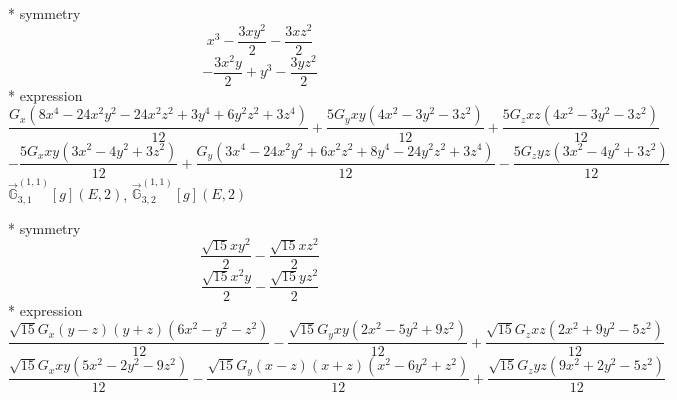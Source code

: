 \documentclass[fleqn,8pt]{jsarticle}
\begin{document}
\noindent\quad ** symmetry
\begin{dmath*}
x^{3} - \frac{3 x y^{2}}{2} - \frac{3 x z^{2}}{2}
\end{dmath*}
\begin{dmath*}
- \frac{3 x^{2} y}{2} + y^{3} - \frac{3 y z^{2}}{2}
\end{dmath*}
\noindent\quad ** expression
\begin{dmath*}
\frac{G_{x} \left(8 x^{4} - 24 x^{2} y^{2} - 24 x^{2} z^{2} + 3 y^{4} + 6 y^{2} z^{2} + 3 z^{4}\right)}{12} + \frac{5 G_{y} x y \left(4 x^{2} - 3 y^{2} - 3 z^{2}\right)}{12} + \frac{5 G_{z} x z \left(4 x^{2} - 3 y^{2} - 3 z^{2}\right)}{12}
\end{dmath*}
\begin{dmath*}
- \frac{5 G_{x} x y \left(3 x^{2} - 4 y^{2} + 3 z^{2}\right)}{12} + \frac{G_{y} \left(3 x^{4} - 24 x^{2} y^{2} + 6 x^{2} z^{2} + 8 y^{4} - 24 y^{2} z^{2} + 3 z^{4}\right)}{12} - \frac{5 G_{z} y z \left(3 x^{2} - 4 y^{2} + 3 z^{2}\right)}{12}
\end{dmath*}
\noindent\quad $\vec{\mathbb{G}}_{3,1}^{(1,1)}[g](E,2)$, $\vec{\mathbb{G}}_{3,2}^{(1,1)}[g](E,2)$

\noindent\quad ** symmetry
\begin{dmath*}
\frac{\sqrt{15} x y^{2}}{2} - \frac{\sqrt{15} x z^{2}}{2}
\end{dmath*}
\begin{dmath*}
\frac{\sqrt{15} x^{2} y}{2} - \frac{\sqrt{15} y z^{2}}{2}
\end{dmath*}
\noindent\quad ** expression
\begin{dmath*}
\frac{\sqrt{15} G_{x} \left(y - z\right) \left(y + z\right) \left(6 x^{2} - y^{2} - z^{2}\right)}{12} - \frac{\sqrt{15} G_{y} x y \left(2 x^{2} - 5 y^{2} + 9 z^{2}\right)}{12} + \frac{\sqrt{15} G_{z} x z \left(2 x^{2} + 9 y^{2} - 5 z^{2}\right)}{12}
\end{dmath*}
\begin{dmath*}
\frac{\sqrt{15} G_{x} x y \left(5 x^{2} - 2 y^{2} - 9 z^{2}\right)}{12} - \frac{\sqrt{15} G_{y} \left(x - z\right) \left(x + z\right) \left(x^{2} - 6 y^{2} + z^{2}\right)}{12} + \frac{\sqrt{15} G_{z} y z \left(9 x^{2} + 2 y^{2} - 5 z^{2}\right)}{12}
\end{dmath*}
\end{document}
